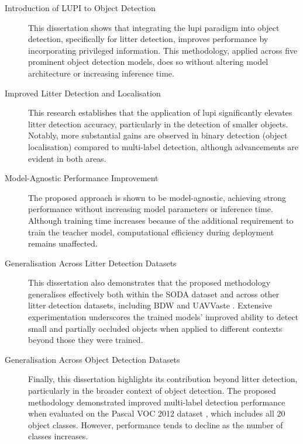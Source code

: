 \begin{description}
    \item [Introduction of LUPI to Object Detection]  
    This dissertation shows that integrating the \gls{lupi} paradigm into object detection, specifically for litter detection, improves performance by incorporating privileged information. This methodology, applied across five prominent object detection models, does so without altering model architecture or increasing inference time.

    \item [Improved Litter Detection and Localisation]  
    This research establishes that the application of \gls{lupi} significantly elevates litter detection accuracy, particularly in the detection of smaller objects. Notably, more substantial gains are observed in binary detection (object localisation) compared to multi-label detection, although advancements are evident in both areas.

    \item [Model-Agnostic Performance Improvement]  
    The proposed approach is shown to be model-agnostic, achieving strong performance without increasing model parameters or inference time. Although training time increases because of the additional requirement to train the teacher model, computational efficiency during deployment remains unaffected.

    \item [Generalisation Across Litter Detection Datasets]  
    This dissertation also demonstrates that the proposed methodology generalises effectively both within the SODA dataset \cite{soda_dataset} and across other litter detection datasets, including BDW \cite{bdwdataset} and UAVVaste \cite{uavvaste}. Extensive experimentation underscores the trained models' improved ability to detect small and partially occluded objects when applied to different contexts beyond those they were trained.

    \item [Generalisation Across Object Detection Datasets]  
    Finally, this dissertation highlights its contribution beyond litter detection, particularly in the broader context of object detection. The proposed methodology demonstrated improved multi-label detection performance when evaluated on the Pascal VOC 2012 dataset \cite{pascal-voc-2012}, which includes all 20 object classes. However, performance tends to decline as the number of classes increases.


\end{description}

